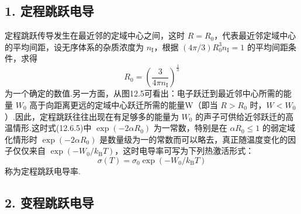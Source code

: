 \subsection*{1. 定程跳跃电导}

定程跳跃传导发生在最近邻的定域中心之间，这时 $R=R_{0}$，代表最近邻定域中心的平均间距，设无序体系的杂质浓度为 $n_{\mathrm{I}}$，根据 $\left(4\pi/3\right)R_{0}^{3}n_{\mathrm{I}}=1$ 的平均间距条件，求得
\begin{equation}
  R_{0}=\left(\frac{3}{4\pi n_{\mathrm{I}}}\right)^{\frac{1}{3}}
\end{equation}
为一个确定的数值.另一方面，从图12.5可看出：电子跃迁到最近邻中心所需的能量 $W_{0}$ 高于向距离更远的定域中心跃迁所需的能量W（即当 $R>R_{0}$ 时，$W<W_{0}$）.因此，定程跳跃往往出现在有足够多的能量为 $W_{0}$ 的声子可供给近邻跃迁的高温情形.这时式(12.6.5)中 $\exp\left(-2\alpha R_{0}\right)$ 为一常数，特别是在 $\alpha R_{0}\leqslant1$ 的弱定域化情形时 $\exp\left(-2\alpha R_{0}\right)$ 是数量级为一的常数而可以略去，真正随温度变化的因子仅仅来自 $\exp\left(-W_{0}/k_{\mathrm{B}}T\right)$，这时电导率可写为下列热激活形式：
\begin{equation}
  \sigma\left(T\right)=\sigma_{0}\exp\left(-W_{0}/k_{\mathrm{B}}T\right)
\end{equation}
称为定程跳跃电导率.

\subsection*{2. 变程跳跃电导}

